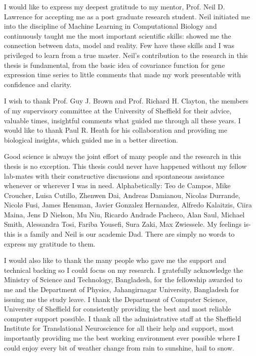 
\begin{acknowledgements}      


I would like to express my deepest gratitude to my mentor, Prof. Neil D. Lawrence for accepting me as a post graduate research student. Neil initiated me into the discipline of Machine Learning in Computational Biology and continuously taught me the most important scientific skills: showed me the connection between data, model and reality. Few have these skills and I was privileged to learn from a true master. Neil’s contribution to the research in this thesis is fundamental, from the basic idea of covariance function for gene expression time series to little comments that made my work presentable with confidence and clarity.

I wish to thank Prof. Guy J. Brown and Prof. Richard H. Clayton, the members of my supervisory committee at the University of Sheffield for their advice, valuable times, insightful comments what guided me through all these years. I would like to thank Paul R. Heath for his collaboration and providing me biological insights, which guided me in a better direction.

Good science is always the joint effort of many people and the research in this thesis is no exception. This thesis could never have happened without my fellow lab-mates with their constructive discussions and spontaneous assistance whenever or wherever I was in need. Alphabetically: Teo de Campos, Mike Croucher, Luisa Cutillo, Zhenwen Dai, Andreas Damianou, Nicolas Durrande, Nicol{\o} Fusi, James Hensman, Javier Gonzalez Hernandez, Alfredo Kalaitzis, Ciira Maina, Jens D Nielson, Mu Niu, Ricardo Andrade Pacheco, Alan Saul, Michael Smith, Alessandra Tosi, Fariba Yousefi, Sura Zaki, Max Zwiessele. My feelings is- this is a family and Neil is our academic Dad. There are simply no words to express my gratitude to them.

I would also like to thank the many people who gave me the support and technical backing so I could focus on my research. I gratefully acknowledge the Ministry of Science and Technology, Bangladesh, for the fellowship awarded to me and  the Department of Physics, Jahangirnagar University, Bangladesh for issuing me the study leave. I thank the Department of Computer Science, University of Sheffield for consistently providing the best and most reliable computer support possible. I thank all the administrative staff at the Sheffield Institute for Translational Neuroscience for all their help and support, most importantly providing me the best working environment ever possible where I could enjoy every bit of weather change from rain to sunshine, hail to snow.


\end{acknowledgements}
